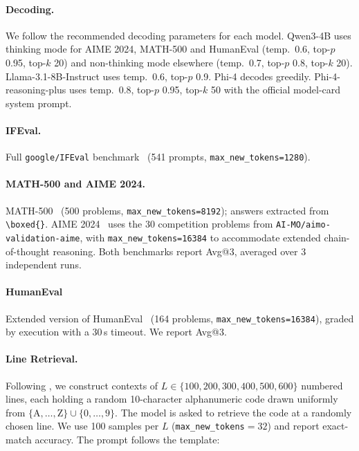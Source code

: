 \documentclass{article}
\begin{document}
\paragraph{Decoding.}
We follow the recommended decoding parameters for each model. Qwen3-4B uses thinking mode for AIME 2024, MATH-500 and HumanEval (temp.\ 0.6, top-$p$ 0.95, top-$k$ 20) and non-thinking mode elsewhere (temp.\ 0.7, top-$p$ 0.8, top-$k$ 20). Llama-3.1-8B-Instruct uses temp.\ 0.6, top-$p$ 0.9. Phi-4 decodes greedily. Phi-4-reasoning-plus uses temp.\ 0.8, top-$p$ 0.95, top-$k$ 50 with the official model-card system prompt.

\paragraph{IFEval.}
Full \texttt{google/IFEval} benchmark~\citep{zhou2023instructionfollowingevaluationlargelanguage_ifeval} (541 prompts, \texttt{max\_new\_tokens=1280}).

\paragraph{MATH-500 and AIME 2024.}
MATH-500~\citep{lightman2024lets_math500} (500 problems, \texttt{max\_new\_tokens=8192}); answers extracted from \verb|\boxed{}|. AIME 2024~\citep{aime24} uses the 30 competition problems from \texttt{AI-MO/aimo-validation-aime}, with \texttt{max\_new\_tokens=16384} to accommodate extended chain-of-thought reasoning. Both benchmarks report Avg@3, averaged over 3 independent runs.


\paragraph{HumanEval}
Extended version of HumanEval~\citep{chen2021evaluating_humaneval} (164 problems, \texttt{max\_new\_tokens=16384}), graded by execution with a 30\,s timeout. We report Avg@3.

\paragraph{Line Retrieval.}
Following \cite{li2023how_line-retrieval}, we construct contexts of $L \in \{100, 200, 300, 400, 500, 600\}$ numbered lines, each holding a random 10-character alphanumeric code drawn uniformly from $\{\mathrm{A},\dots,\mathrm{Z}\} \cup \{0,\dots,9\}$. The model is asked to retrieve the code at a randomly chosen line. We use 100 samples per $L$ (\texttt{max\_new\_tokens}$=32$) and report exact-match accuracy. The prompt follows the template:
\end{document}
